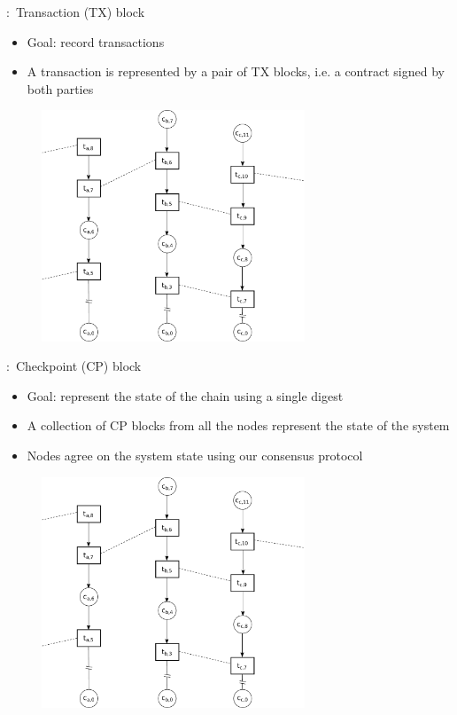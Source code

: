 \documentclass{beamer}
\begin{document}
\begin{frame}{\subsecname:~Transaction (TX) block}
\begin{itemize}
  \item Goal: record transactions
  \item A transaction is represented by a pair of TX blocks,
  i.e. a contract signed by both parties
\end{itemize}
\begin{figure}[h]
  \includegraphics[trim={7cm 8.2cm 2cm 2.55cm},clip,width=0.7\textwidth]{trustchain-good-cp}
  \centering
\end{figure}
\end{frame}

\begin{frame}{\subsecname:~Checkpoint (CP) block}
  \begin{itemize}
    \item Goal: represent the state of the chain using a single digest
    \item A collection of CP blocks from all the nodes represent the state of the system
    \item Nodes agree on the system state using our consensus protocol
  \end{itemize}
\begin{figure}[h]
  \includegraphics[trim={7cm 2.505cm 2cm 8.55cm},clip,width=0.7\textwidth]{trustchain-good-cp}
  \centering
\end{figure}
\end{frame}
\end{document}
